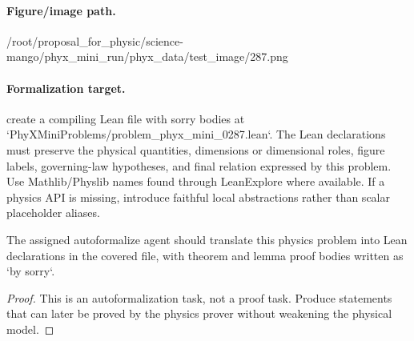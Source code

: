 \paragraph{Figure/image path.}
/root/proposal\_for\_physic/science-mango/phyx\_mini\_run/phyx\_data/test\_image/287.png

\paragraph{Formalization target.}
create a compiling Lean file with sorry bodies at `PhyXMiniProblems/problem\_phyx\_mini\_0287.lean`. The Lean declarations must preserve the physical quantities, dimensions or dimensional roles, figure labels, governing-law hypotheses, and final relation expressed by this problem.
Use Mathlib/Physlib names found through LeanExplore where available. If a physics API is missing, introduce faithful local abstractions rather than scalar placeholder aliases.

\begin{theorem}
\label{thm:physics:phyx_mini_0287:target}
The assigned autoformalize agent should translate this physics problem into Lean declarations in the covered file, with theorem and lemma proof bodies written as `by sorry`.
\end{theorem}
\begin{proof}
This is an autoformalization task, not a proof task. Produce statements that can later be proved by the physics prover without weakening the physical model.
\end{proof}

